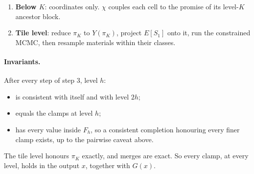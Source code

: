 \documentclass[11pt]{article}
\newcommand{\1}{\mathds{1}}
\begin{document}
\begin{enumerate}
\begin{enumerate}
                allowed when:
                \begin{itemize}
                  \item for siblings under one parent, it is a realising pair of that parent's
                        value, $(c, c') \in \mathrm{Real}_h(\pi_{2h}(\mathrm{par}), \cdot)$
                        restricted to the chain;
                  \item for a pair across two parents, $(c, c') \in B_h$.
                \end{itemize}
                $T = 0$ gives the MAP chain (prolong); $T > 0$ gives an exact draw (perturb).
          \item \emph{Smooth}: $n_h$ sweeps. Each sweep redraws the even chains given the odd
                ones and then the odd given the even, each an exact block-Gibbs step. It then
                runs the coordinate smoother on $\varphi_h\chi_h$ against the current promises.
        \end{enumerate}
  \item \textbf{Below $K$}: coordinates only. $\chi$ couples each cell to the promise of its
        level-$K$ ancestor block.
  \item \textbf{Tile level}: reduce $\pi_K$ to $Y(\pi_K)$, project $E[S_1]$ onto it, run the
        constrained MCMC, then resample materials within their classes.
\end{enumerate}

\paragraph{Invariants.} After every step of step 3, level $h$:
\begin{itemize}
  \item is consistent with itself and with level $2h$;
  \item equals the clamps at level $h$;
  \item has every value inside $F_h$, so a consistent completion honouring every finer clamp
        exists, up to the pairwise caveat above.
\end{itemize}
The tile level honours $\pi_K$ exactly, and merges are exact. So every clamp, at every level,
holds in the output $x$, together with $G(x)$.
\end{document}

